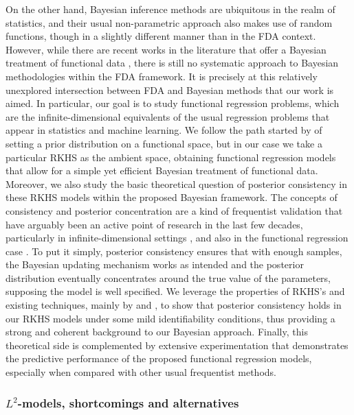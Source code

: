\documentclass{article}
\numberwithin{equation}{section}
\theoremstyle{plain}
\begin{document}
On the other hand, Bayesian inference methods are ubiquitous in the realm of statistics, and their usual non-parametric approach also makes use of random functions, though in a slightly different manner than in the FDA context. However, while there are recent works in the literature that offer a Bayesian treatment of functional data \citep[e.g.][]{scarpa2009bayesian, crainiceanu2010bayesian, shi2011gaussian, kang2023fast}, there is still no systematic approach to Bayesian methodologies within the FDA framework. It is precisely at this relatively unexplored intersection between FDA and Bayesian methods that our work is aimed. In particular, our goal is to study functional regression problems, which are the infinite-dimensional equivalents of the usual regression problems that appear in statistics and machine learning. We follow the path started by \citet{ferguson1974prior} of setting a prior distribution on a functional space, but in our case we take a particular RKHS as the ambient space, obtaining functional regression models that allow for a simple yet efficient Bayesian treatment of functional data. Moreover, we also study the basic theoretical question of posterior consistency in these RKHS models within the proposed Bayesian framework. The concepts of consistency and posterior concentration are a kind of frequentist validation that have arguably been an active point of research in the last few decades, particularly in infinite-dimensional settings \citep[see][]{amewou2003posterior, ghosh2003bayesian, choi2008remarks}, and also in the functional regression case \citep[e.g.][]{lian2016posterior,abraham2020posterior}. To put it simply, posterior consistency ensures that with enough samples, the Bayesian updating mechanism works as intended and the posterior distribution eventually concentrates around the true value of the parameters, supposing the model is well specified. We leverage the properties of RKHS's and existing techniques, mainly by \citet{nobile1994bayesian} and \citet{miller2023consistency}, to show that posterior consistency holds in our RKHS models under some mild identifiability conditions, thus providing a strong and coherent background to our Bayesian approach. Finally, this theoretical side is complemented by extensive experimentation that demonstrates the predictive performance of the proposed functional regression models, especially when compared with other usual frequentist methods.

\subsubsection*{\(L^2\)-models, shortcomings and alternatives}
\end{document}
